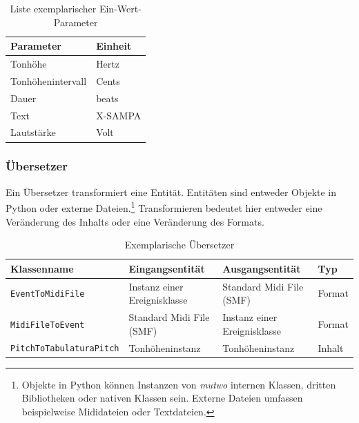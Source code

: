 \documentclass[12pt,a4paper,ngerman]{article}
\begin{document}
\begin{table}[h!]
    \begin{center}
        \begin{tabular}{l l} 
            \hline
            Parameter & Einheit \\ [0.5ex] 
            \hline\hline
            Tonhöhe & Hertz \\ 
            Tonhöhenintervall & Cents \\ 
            Dauer & beats \\ 
            Text & X-SAMPA\footnotemark \\ 
            Lautstärke & Volt \\ [1ex] 
            \hline
        \end{tabular}
    \end{center}

    \caption{Liste exemplarischer Ein-Wert-Parameter}
\end{table}


\subsubsection{Übersetzer}

Ein Übersetzer transformiert eine Entität.
Entitäten sind entweder Objekte in Python oder externe Dateien.\footnote{%
    Objekte in Python können Instanzen von \emph{mutwo} internen Klassen, dritten Bibliotheken oder nativen Klassen sein.
    Externe Dateien umfassen beispielweise Mididateien oder Textdateien.
}
Transformieren bedeutet hier entweder eine Veränderung des Inhalts oder eine Veränderung des Formats.


\begin{table}[h!]
    \begin{center}
        \smaller
        \begin{tabular}{l l l l} 
            \hline
            Klassenname & Eingangsentität & Ausgangsentität & Typ \\ [0.5ex] 
            \hline\hline
            \texttt{EventToMidiFile} & Instanz einer Ereignisklasse & Standard Midi File (SMF) & Format \\ 
            \texttt{MidiFileToEvent} & Standard Midi File (SMF) & Instanz einer Ereignisklasse & Format \\ 
            \texttt{PitchToTabulaturaPitch} & Tonhöheninstanz & Tonhöheninstanz & Inhalt \\ [1ex] 
            \hline
        \end{tabular}

    \end{center}
    \caption{Exemplarische Übersetzer}
\end{table}
\end{document}
